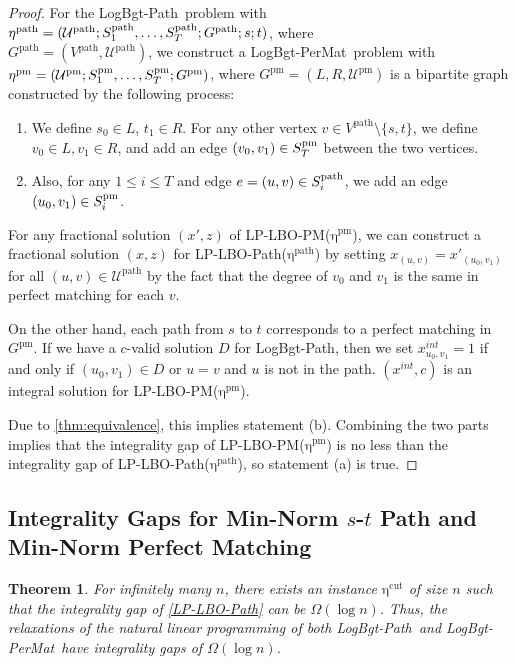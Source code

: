 \documentclass[11pt,a4paper]{article} \usepackage{enumitem}
\newcommand{\calU}{\mathcal{U}}
\newcommand{\LBOmatch}{\textsf{LogBgt-PerMat}}
\newcommand{\LBOpath}{\textsf{LogBgt-Path}}
\newcommand{\pathU}{\operatorname{\calU^{path}}}
\newcommand{\pathS}[1]{\ifx\relax#1\relax
    S^{\operatorname{path}} \else
    S^{\operatorname{path}}_{#1} \fi
}
\newcommand{\patheta}{\operatorname{\eta^{path}}}
\newcommand{\pathG}{G^{\operatorname{path}}}
\newcommand{\pathV}{V^{\operatorname{path}}}
\newcommand{\pmU}{\operatorname{\calU^{pm}}}
\newcommand{\pmS}[1]{\ifx\relax#1\relax
    S^{\operatorname{pm}} \else
    S^{\operatorname{pm}}_{#1} \fi
}
\newcommand{\pmeta}{\operatorname{\eta^{pm}}}
\newcommand{\pmG}{G^{\operatorname{pm}}}
\newcommand{\cuteta}{\operatorname{\eta^{cut}}}
\newtheorem{theorem}{Theorem}[section]
\theoremstyle{definition}
\begin{document}
\begin{proof}
For the \LBOpath\ problem with $\patheta = (\pathU; \pathS{1}, \ldots, \pathS{T}; \pathG; s; t)$, where\\
$\pathG = (\pathV, \pathU)$, we construct a \LBOmatch\ problem 
with  $\pmeta = (\pmU; \pmS{1}, \ldots, \pmS{T}; \pmG)$, where $\pmG = (L, R, \pmU)$ 
is a bipartite graph constructed by the following process:
\begin{enumerate}
\item We define $s_0 \in L$, $t_1 \in R$. For any other vertex $v \in \pathV \setminus \{s, t\}$, we define $v_0 \in L, v_1 \in R$, and add an edge $(v_0, v_1) \in \pmS{T}$ between the two vertices.

\item Also, for any $1 \leq i \leq T$ and edge $e = (u, v) \in \pathS{i}$, we add an edge $(u_0, v_1) \in \pmS{i}$.
\end{enumerate}
For any fractional solution $(x', z)$ of LP-LBO-PM($\pmeta$), we can construct a fractional solution $(x, z)$ for LP-LBO-Path($\patheta$) by setting $x_{(u, v)} = x'_{(u_0, v_1)}$ for all $(u, v) \in \pathU$ by the fact that the degree of $v_0$ and $v_1$ is the same in perfect matching for each $v$.

On the other hand, each path from $s$ to $t$ corresponds to a perfect matching in $\pmG$. If we have a $c$-valid solution $D$ for \LBOpath, then we set $x^{int}_{u_0, v_1} = 1$ if and only if $(u_0, v_1) \in D$ or $u = v$ and $u$ is not in the path. $(x^{int}, c)$ is an integral solution for LP-LBO-PM($\pmeta$).

Due to \cref{thm:equivalence}, this implies statement (b). Combining the two parts implies that the integrality gap of LP-LBO-PM($\pmeta$) is no less than the integrality gap of LP-LBO-Path($\patheta$), so statement (a) is true.
\end{proof}



\subsection{Integrality Gaps for Min-Norm $s$-$t$ Path and Min-Norm Perfect Matching}  \label{sec:integralgap-2}

\begin{theorem} \label{thm:intgap-1}
For infinitely many $n$, there exists an instance $\cuteta$ of size $n$ such that the integrality gap of \cref{LP-LBO-Path} can be $\Omega(\log n)$.
    Thus, the relaxations of the natural linear programming of both \LBOpath\ and \LBOmatch\ have integrality gaps of $\Omega(\log n)$.
\end{theorem}
\end{document}
